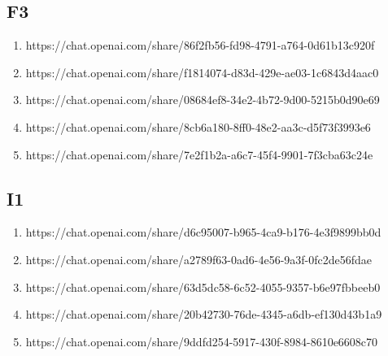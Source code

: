 \subsection{F3}

\begin{enumerate}
    \item https://chat.openai.com/share/86f2fb56-fd98-4791-a764-0d61b13c920f
    \item https://chat.openai.com/share/f1814074-d83d-429e-ae03-1c6843d4aac0
    \item https://chat.openai.com/share/08684ef8-34e2-4b72-9d00-5215b0d90e69
    \item https://chat.openai.com/share/8cb6a180-8ff0-48e2-aa3c-d5f73f3993e6
    \item https://chat.openai.com/share/7e2f1b2a-a6c7-45f4-9901-7f3cba63c24e
\end{enumerate}

\subsection{I1}

\begin{enumerate}
    \item https://chat.openai.com/share/d6c95007-b965-4ca9-b176-4e3f9899bb0d
    \item https://chat.openai.com/share/a2789f63-0ad6-4e56-9a3f-0fc2de56fdae
    \item https://chat.openai.com/share/63d5dc58-6c52-4055-9357-b6e97fbbeeb0
    \item https://chat.openai.com/share/20b42730-76de-4345-a6db-ef130d43b1a9
    \item https://chat.openai.com/share/9ddfd254-5917-430f-8984-8610e6608c70
\end{enumerate}